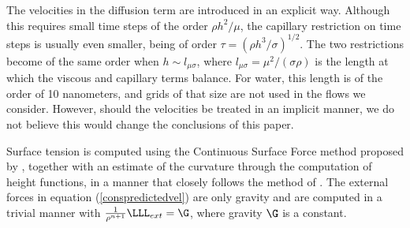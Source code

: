 The velocities in the diffusion term are introduced in an explicit way. Although this requires small
time steps of the order $\rho h^2/\mu$, the capillary restriction on time steps
is usually even smaller, being of order $\tau = (\rho h^3/\sigma)^{1/2}$. The two restrictions
become of the same order when $h \sim l_{\mu \sigma}$, where $l_{\mu \sigma} = \mu^2 / (\sigma \rho)$ 
is the length at which the viscous and capillary terms balance. For water, this length is 
of the order of 10 nanometers, and grids of that size are not used in the flows we consider. 
However, should the velocities be treated in an implicit manner, we do not believe this would
change the conclusions of this paper. 

Surface tension is computed using the Continuous Surface Force method proposed by 
\cite{brackbill92}, together with an estimate of the curvature through the computation
of height functions, in a manner that closely follows the method of \cite{popinet09}. 
The external forces in equation (\ref{conspredictedvel}) 
are only gravity and are computed in a trivial manner with 
$\frac 1 {\rho^{n+1}} \LLL_{ext} =  \G$, where gravity $\G$  is a constant. 


